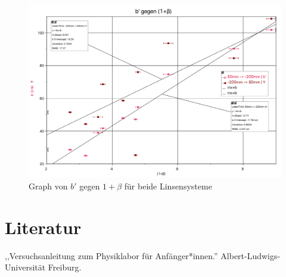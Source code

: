 \documentclass[11pt,a4paper]{article}
\begin{document}
\begin{figure}[h]
	\centering
	\includegraphics[width=\linewidth]{Abb5}
	\caption{Graph von $b'$ gegen $1+\beta$ für beide Linsensysteme}
\end{figure}
\section{Literatur}
,,Versuchsanleitung zum Physiklabor für Anfänger*innen.'' Albert-Ludwigs-Universität Freiburg. 
\end{document}
